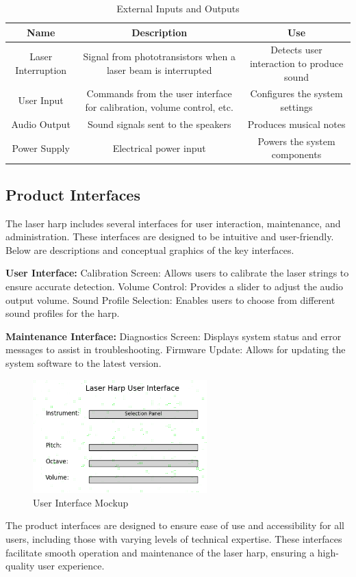 \begin{table}[H]
\centering
\begin{tabular}{|c|c|c|}
\hline
\textbf{Name} & \textbf{Description} & \textbf{Use} \\ \hline
Laser Interruption & Signal from phototransistors when a laser beam is interrupted & Detects user interaction to produce sound \\ \hline
User Input & Commands from the user interface for calibration, volume control, etc. & Configures the system settings \\ \hline
Audio Output & Sound signals sent to the speakers & Produces musical notes \\ \hline
Power Supply & Electrical power input & Powers the system components \\ \hline
\end{tabular}
\caption{External Inputs and Outputs}
\end{table}

\subsection{Product Interfaces}
The laser harp includes several interfaces for user interaction, maintenance, and administration. These interfaces are designed to be intuitive and user-friendly. Below are descriptions and conceptual graphics of the key interfaces.

\textbf{User Interface:}
Calibration Screen: Allows users to calibrate the laser strings to ensure accurate detection.
Volume Control: Provides a slider to adjust the audio output volume.
Sound Profile Selection: Enables users to choose from different sound profiles for the harp.

\textbf{Maintenance Interface:}
Diagnostics Screen: Displays system status and error messages to assist in troubleshooting.
Firmware Update: Allows for updating the system software to the latest version.

\begin{figure}[h!]
	\centering
   	\includegraphics[width=0.60\textwidth]{images/UI}
    \caption{User Interface Mockup}
\end{figure}

The product interfaces are designed to ensure ease of use and accessibility for all users, including those with varying levels of technical expertise. These interfaces facilitate smooth operation and maintenance of the laser harp, ensuring a high-quality user experience.

